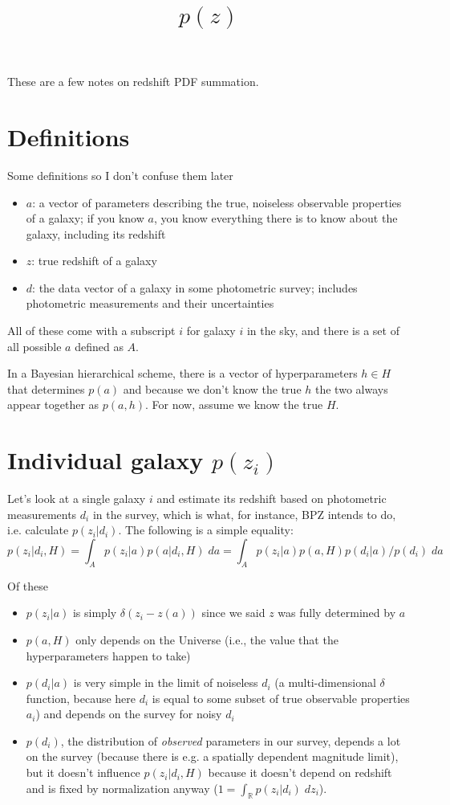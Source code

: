 \documentclass[11pt]{amsart}
\title{$p(z)$}
\begin{document}
\maketitle

These are a few notes on redshift PDF summation.

\section{Definitions}

Some definitions so I don't confuse them later
\begin{itemize}
\item $a$: a vector of parameters describing the true, noiseless observable properties of a galaxy; if you know $a$, you know everything there is to know about the galaxy, including its redshift
\item $z$: true redshift of a galaxy 
\item $d$: the data vector of a galaxy in some photometric survey; includes photometric measurements and their uncertainties
\end{itemize}
All of these come with a subscript $i$ for galaxy $i$ in the sky, and there is a set of all possible $a$ defined as $A$. 

In a Bayesian hierarchical scheme, there is a vector of hyperparameters $h\in H$ that determines $p(a)$ and because we don't know the true $h$ the two always appear together as $p(a,h)$. For now, assume we know the true $H$.
\section{Individual galaxy $p(z_i)$}

Let's look at a single galaxy $i$ and estimate its redshift based on photometric measurements $d_i$ in the survey, which is what, for instance, BPZ intends to do, i.e. calculate $p(z_i|d_i)$. The following is a simple equality:
\begin{equation}
p(z_i|d_i, H)=\int_{A} p(z_i|a) p(a|d_i, H) \; da = \int_{A} p(z_i|a) p(a, H) p(d_i|a) / p(d_i) \; da
\end{equation}

Of these
\begin{itemize}
\item $p(z_i|a)$ is simply $\delta(z_i-z(a))$ since we said $z$ was fully determined by $a$ 
\item $p(a, H)$ only depends on the Universe (i.e., the value that the hyperparameters happen to take)
\item $p(d_i|a)$ is very simple in the limit of noiseless $d_i$ (a multi-dimensional $\delta$ function, because here $d_i$ is equal to some subset of true observable properties $a_i$) and depends on the survey for noisy $d_i$
\item $p(d_i)$, the distribution of \emph{observed} parameters in our survey, depends a lot on the survey (because there is e.g. a spatially dependent magnitude limit), but it doesn't influence $p(z_i|d_i, H)$ because it doesn't depend on redshift and is fixed by normalization anyway ($1=\int_{\mathbb{R}} p(z_i|d_i)\; dz_i$).
\end{itemize}
\end{document}

